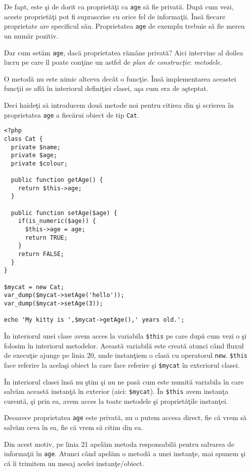 De fapt, este şi de dorit ca proprietăţi ca \texttt{age} să fie privată. După cum vezi,
aceste proprietăţi pot fi suprascrise cu orice fel de informaţii. Însă fiecare proprietate
are specificul său. Proprietatea \texttt{age} de exemplu trebuie să fie mereu un număr pozitiv.

Dar cum setăm \texttt{age}, dacă proprietatea rămâne privată? Aici intervine al doilea lucru
pe care îl poate conţine un astfel de \textit{plan de construcţie}: \textsl{metodele}.

O metodă nu este nimic altceva decât o funcţie. Însă implementarea aceastei funcţii se află
în interiorul definiţiei clasei, aşa cum era de aşteptat.

Deci haideţi să introducem două metode noi pentru citirea din şi scrierea în proprietatea
\texttt{age} a fiecărui obiect de tip \texttt{Cat}.

\begin{lstlisting}[title=Getters and Setters]
<?php
class Cat {
  private $name;
  private $age;
  private $colour;

  public function getAge() {
    return $this->age;
  }

  public function setAge($age) {
    if(is_numeric($age)) {
      $this->age = age;
      return TRUE;
    }
    return FALSE;
  }
}

$mycat = new Cat;
var_dump($mycat->setAge('hello'));
var_dump($mycat->setAge(3));

echo 'My kitty is ',$mycat->getAge(),' years old.';
\end{lstlisting}

În interiorul unei clase avem acces la variabila \texttt{\$this} pe care
după cum vezi o şi folosim în interiorul metodelor. Această variabilă
este creată atunci când fluxul de execuţie ajunge pe linia 20, unde instanţiem
o clasă cu operatorul \texttt{new}. \texttt{\$this} face referire la acelaşi obiect la care face
referire şi \texttt{\$mycat} în exteriorul clasei.

În interiorul clasei însă nu ştim şi nu ne pasă cum este numită variabila
în care salvăm această instanţă în exterior (aici: \texttt{\$mycat}).
În \texttt{\$this} avem instanţa curentă,
şi prin ea, avem acces la toate metodele şi proprietăţile instanţei.

Deoarece proprietatea \texttt{age} este privată, nu o putem accesa direct,
fie că vrem să salvăm ceva în ea, fie că vrem să citim din ea.

Din acest motiv, pe linia 21 apelăm metoda responsabilă pentru salvarea
de informaţii în \texttt{age}. Atunci când apelăm o metodă a unei instanţe,
mai spunem şi că îi trimitem un mesaj acelei instanţe/obiect.

